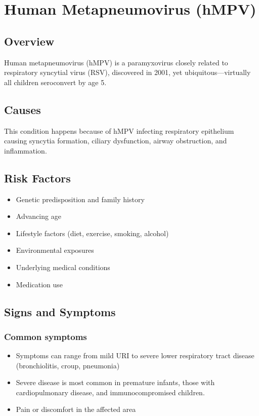 \chapter{Human Metapneumovirus (hMPV)}
\label{sec:pediatric:Human Metapneumovirus}

\section{Overview}
Human metapneumovirus (hMPV) is a paramyxovirus closely related to respiratory syncytial virus (RSV), discovered in 2001, yet ubiquitous---virtually all children seroconvert by age 5.
\section{Causes}
This condition happens because of hMPV infecting respiratory epithelium causing syncytia formation, ciliary dysfunction, airway obstruction, and inflammation.     
\section{Risk Factors}

\begin{itemize}[noitemsep]
  \item Genetic predisposition and family history
  \item Advancing age
  \item Lifestyle factors (diet, exercise, smoking, alcohol)
  \item Environmental exposures
  \item Underlying medical conditions
  \item Medication use
\end{itemize}
\section{Signs and Symptoms}

\subsection{Common symptoms}
\begin{itemize}[noitemsep]
  \item Symptoms can range from mild URI to severe lower respiratory tract disease (bronchiolitis, croup, pneumonia)
  \item Severe disease is most common in premature infants, those with cardiopulmonary disease, and immunocompromised children.
  \item Pain or discomfort in the affected area
  \end{itemize}


